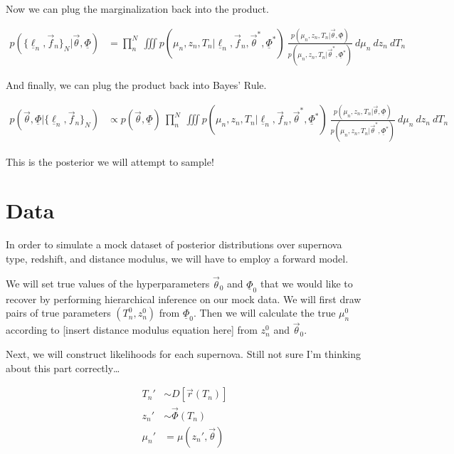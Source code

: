 \documentclass[12pt, onecolumn]{emulateapj}
\newcommand{\textul}{\underline}
\begin{document}
Now we can plug the marginalization back into the product.

\begin{align}
p(\{\textul{\ell}_{n}, \vec{f}_{n}\}_{N} | \vec{\theta}, \textul{\Phi}) &= \prod_{n}^{N}\ \iiint p(\mu_{n}, z_{n}, T_{n} | \textul{\ell}_{n}, \vec{f}_{n}, \vec{\theta}^{*}, \textul{\Phi}^{*})\ \frac{p(\mu_{n}, z_{n}, T_{n} | \vec{\theta}, \textul{\Phi})}{p(\mu_{n}, z_{n}, T_{n} | \vec{\theta}^{*}, \textul{\Phi}^{*})}\ d\mu_{n}\ dz_{n}\ dT_{n}
\end{align}

And finally, we can plug the product back into Bayes' Rule.

\begin{align}
p(\vec{\theta}, \textul{\Phi} | \{\textul{\ell}_{n}, \vec{f}_{n}\}_{N}) &\propto p(\vec{\theta}, \textul{\Phi})\ \prod_{n}^{N}\ \iiint p(\mu_{n}, z_{n}, T_{n} | \textul{\ell}_{n}, \vec{f}_{n}, \vec{\theta}^{*}, \textul{\Phi}^{*})\ \frac{p(\mu_{n}, z_{n}, T_{n} | \vec{\theta}, \textul{\Phi})}{p(\mu_{n}, z_{n}, T_{n} | \vec{\theta}^{*}, \textul{\Phi}^{*})}\ d\mu_{n}\ dz_{n}\ dT_{n}
\end{align}

This is the posterior we will attempt to sample!

\section{Data}
\label{sec:data}

In order to simulate a mock dataset of posterior distributions over supernova type, redshift, and distance modulus, we will have to employ a forward model.

We will set true values of the hyperparameters $\vec{\theta}_{0}$ and $\textul{\Phi}_{0}$ that we would like to recover by performing hierarchical inference on our mock data.  We will first draw pairs of true parameters $(T_{n}^{0}, z_{n}^{0})$ from $\textul{\Phi}_{0}$.  Then we will calculate the true $\mu_{n}^{0}$ according to [insert distance modulus equation here] from $z_{n}^{0}$ and $\vec{\theta}_{0}$.

Next, we will construct likelihoods for each supernova.  Still not sure I'm thinking about this part correctly\dots

\begin{align}
T_{n}' &\sim D[\vec{r}(T_{n})]\\
z_{n}' &\sim \vec{\Phi}(T_{n})\\
\mu_{n}' &= \mu(z_{n}', \vec{\theta})
\end{align}




\end{document}
